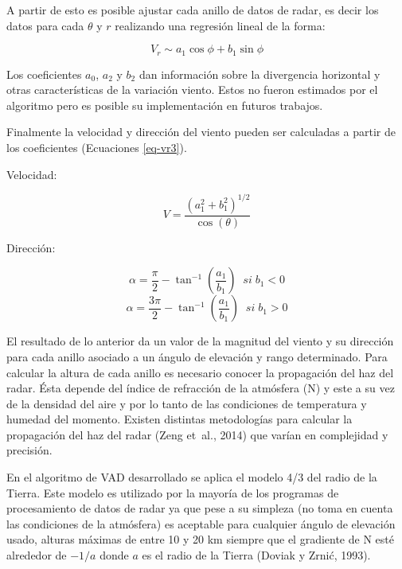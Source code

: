 \documentclass[12pt,spanish,oneside, a4paper]{book}
\begin{document}
A partir de esto es posible ajustar cada anillo de datos de radar, es
decir los datos para cada \(\theta\) y \(r\) realizando una regresión
lineal de la forma:

\begin{equation}
\label{eq-vr4}
V_r \sim a_1\cos \phi + b_1 \sin \phi
\end{equation}

Los coeficientes \(a_0\), \(a_2\) y \(b_2\) dan información sobre la
divergencia horizontal y otras características de la variación viento.
Estos no fueron estimados por el algoritmo pero es posible su
implementación en futuros trabajos.

Finalmente la velocidad y dirección del viento pueden ser calculadas a
partir de los coeficientes (Ecuaciones \ref{eq-vr3}).

Velocidad:

\begin{equation}
\label{eq-vr5}
V = \frac{(a_{1}^{2} + b_{1}^{2})^{1/2}}{\cos(\theta)}
\end{equation}

Dirección:

\begin{equation}\label{eq-vr6}
\alpha = \frac{\pi}{2}-\tan^{-1}(\frac{a_1}{b_1}) \; \; si \; b_1 < 0 
\end{equation}\begin{equation}\label{eq-vr7}
\alpha = \frac{3\pi}{2}-\tan^{-1}(\frac{a_1}{b_1}) \; \; si \; b_1 > 0
\end{equation}

El resultado de lo anterior da un valor de la magnitud del viento y su
dirección para cada anillo asociado a un ángulo de elevación y rango
determinado. Para calcular la altura de cada anillo es necesario conocer
la propagación del haz del radar. Ésta depende del índice de refracción
de la atmósfera (N) y este a su vez de la densidad del aire y por lo
tanto de las condiciones de temperatura y humedad del momento. Existen
distintas metodologías para calcular la propagación del haz del radar
(Zeng et~al., 2014) que varían en complejidad y precisión.

En el algoritmo de VAD desarrollado se aplica el modelo 4/3 del radio de
la Tierra. Este modelo es utilizado por la mayoría de los programas de
procesamiento de datos de radar ya que pese a su simpleza (no toma en
cuenta las condiciones de la atmósfera) es aceptable para cualquier
ángulo de elevación usado, alturas máximas de entre 10 y 20 km siempre
que el gradiente de N esté alrededor de \(-1/a\) donde \(a\) es el radio
de la Tierra (Doviak y Zrnić, 1993).
\end{document}
